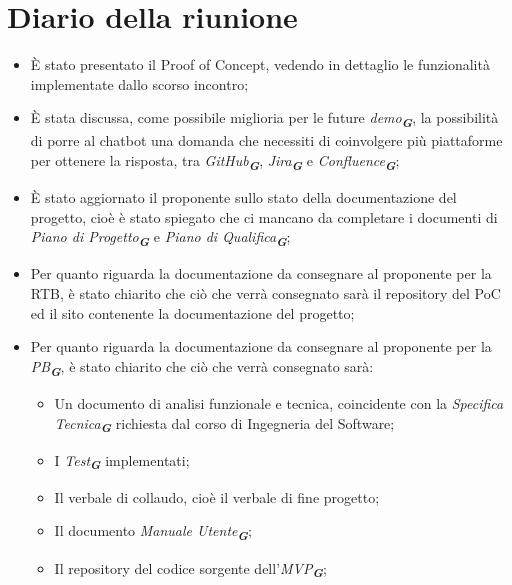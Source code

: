 
\section{Diario della riunione}

\begin{itemize}
    \item È stato presentato il Proof of Concept, vedendo in dettaglio le funzionalità implementate dallo scorso incontro;
    \item È stata discussa, come possibile miglioria per le future \emph{demo}\textsubscript{\textbf{\textit{G}}}, la possibilità di porre
    al chatbot una domanda che necessiti di coinvolgere più piattaforme per ottenere la risposta, tra 
    \emph{GitHub}\textsubscript{\textbf{\textit{G}}}, \emph{Jira}\textsubscript{\textbf{\textit{G}}} e 
    \emph{Confluence}\textsubscript{\textbf{\textit{G}}};
    \item È stato aggiornato il proponente sullo stato della documentazione del progetto, cioè è stato spiegato che
    ci mancano da completare i documenti di \emph{Piano di Progetto}\textsubscript{\textbf{\textit{G}}} e
    \emph{Piano di Qualifica}\textsubscript{\textbf{\textit{G}}};
    \item Per quanto riguarda la documentazione da consegnare al proponente per la RTB, è stato chiarito che ciò che verrà consegnato
    sarà il repository del PoC ed il sito contenente la documentazione del progetto;
    \item Per quanto riguarda la documentazione da consegnare al proponente per la \emph{PB}\textsubscript{\textbf{\textit{G}}}, è stato chiarito che ciò che verrà consegnato
    sarà:
    \begin{itemize}
        \item Un documento di analisi funzionale e tecnica, coincidente con la \emph{Specifica Tecnica}\textsubscript{\textbf{\textit{G}}}
        richiesta dal corso di Ingegneria del Software;
        \item I \emph{Test}\textsubscript{\textbf{\textit{G}}} implementati;
        \item Il verbale di collaudo, cioè il verbale di fine progetto;
        \item Il documento \emph{Manuale Utente}\textsubscript{\textbf{\textit{G}}};
        \item Il repository del codice sorgente dell'\emph{MVP}\textsubscript{\textbf{\textit{G}}};

\end{itemize}
\end{itemize}
